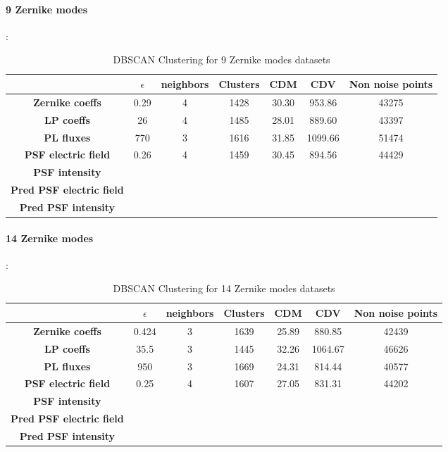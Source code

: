 		\paragraph{9 Zernike modes}:
		\begin{table}[h!]
			\centering
			\begin{tabular}{|c|c|c|c|c|c|c|}
				\hline
				\textbf{} & \textbf{$\epsilon$} & \textbf{neighbors} & \textbf{Clusters} & \textbf{CDM} & \textbf{CDV} & \textbf{Non noise points}\\
				\hline
				\textbf{Zernike coeffs} & 0.29 & 4 & 1428 & 30.30 & 953.86 & 43275 \\
				\hline
				\textbf{LP coeffs} & 26 & 4 & 1485 & 28.01 & 889.60 & 43397 \\
				\hline
				\textbf{PL fluxes} & 770 & 3 & 1616 & 31.85 & 1099.66 & 51474 \\
				\hline
				\textbf{PSF electric field} & 0.26 & 4 & 1459 & 30.45 & 894.56 & 44429 \\
				\hline
				\textbf{PSF intensity} &  &  &  &  &  &  \\
				\hline
				\textbf{Pred PSF electric field} &  &  &  &  &  &  \\
				\hline
				\textbf{Pred PSF intensity} &  &  &  &  &  &  \\
				\hline
			\end{tabular}
		\caption{DBSCAN Clustering for 9 Zernike modes datasets}
		\end{table}
		\FloatBarrier
		
		\paragraph{14 Zernike modes}:
		\begin{table}[h!]
			\centering
			\begin{tabular}{|c|c|c|c|c|c|c|}
				\hline
				\textbf{} & \textbf{$\epsilon$} & \textbf{neighbors} & \textbf{Clusters} & \textbf{CDM} & \textbf{CDV} & \textbf{Non noise points}\\
				\hline
				\textbf{Zernike coeffs} & 0.424 & 3 & 1639 & 25.89 & 880.85 & 42439 \\
				\hline
				\textbf{LP coeffs} & 35.5 & 3 & 1445 & 32.26 & 1064.67 & 46626 \\
				\hline
				\textbf{PL fluxes} & 950 & 3 & 1669 & 24.31 & 814.44 & 40577 \\
				\hline
				\textbf{PSF electric field} & 0.25 & 4 & 1607 & 27.05 & 831.31 & 44202 \\
				\hline
				\textbf{PSF intensity} &  &  &  &  &  &  \\
				\hline
				\textbf{Pred PSF electric field} &  &  &  &  &  &  \\
				\hline
				\textbf{Pred PSF intensity} &  &  &  &  &  &  \\
				\hline
			\end{tabular}
		\caption{DBSCAN Clustering for 14 Zernike modes datasets}
		\end{table}
		\FloatBarrier
		
